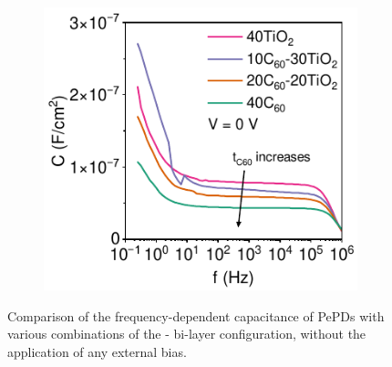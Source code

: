 \begin{figure}[ht!]
    \centering
    
    \begin{subfigure}[t]{0.45\textwidth}
        \centering
        \includegraphics[width=\textwidth]{chapters/transport_layers/images/Cf_comparison.pdf} %
        
    \end{subfigure}
    \caption{Comparison of the frequency-dependent capacitance of PePDs with various combinations of the - bi-layer configuration, without the application of any external bias. }
    \label{fig:etl_opt:capacitance}
\end{figure}


